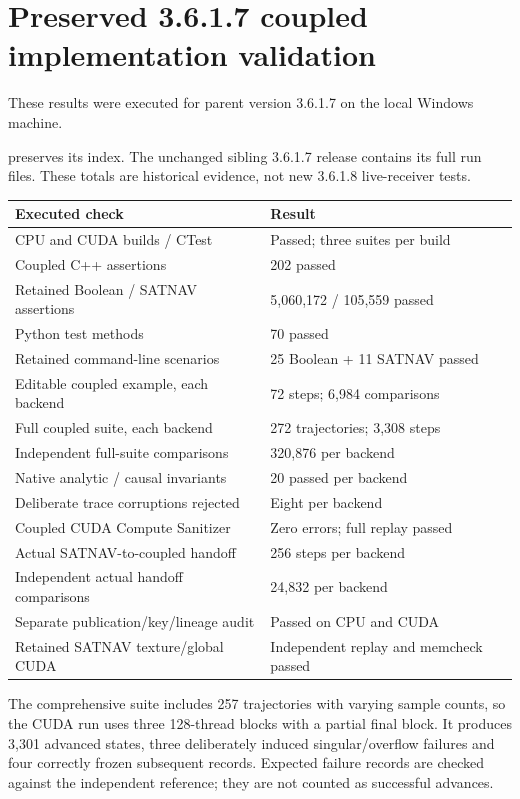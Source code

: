 \section{Preserved 3.6.1.7 coupled implementation validation}
These results were executed for parent version 3.6.1.7 on the local Windows machine.

 preserves its index.
The unchanged sibling 3.6.1.7 release contains its full run files. These totals
are historical evidence, not new 3.6.1.8 live-receiver tests.

\begin{center}
\begin{tabularx}{\textwidth}{@{}P{.54\textwidth}Y@{}}\toprule
\textbf{Executed check} & \textbf{Result}\\\midrule
CPU and CUDA builds / CTest & Passed; three suites per build\\
Coupled C++ assertions & 202 passed\\
Retained Boolean / SATNAV assertions & 5,060,172 / 105,559 passed\\
Python test methods & 70 passed\\
Retained command-line scenarios & 25 Boolean + 11 SATNAV passed\\
Editable coupled example, each backend & 72 steps; 6,984 comparisons\\
Full coupled suite, each backend & 272 trajectories; 3,308 steps\\
Independent full-suite comparisons & 320,876 per backend\\
Native analytic / causal invariants & 20 passed per backend\\
Deliberate trace corruptions rejected & Eight per backend\\
Coupled CUDA Compute Sanitizer & Zero errors; full replay passed\\
Actual SATNAV-to-coupled handoff & 256 steps per backend\\
Independent actual handoff comparisons & 24,832 per backend\\
Separate publication/key/lineage audit & Passed on CPU and CUDA\\
Retained SATNAV texture/global CUDA & Independent replay and memcheck passed\\\bottomrule
\end{tabularx}
\end{center}

The comprehensive suite includes 257 trajectories with varying sample counts, so
the CUDA run uses three 128-thread blocks with a partial final block. It produces
3,301 advanced states, three deliberately induced singular/overflow failures and
four correctly frozen subsequent records. Expected failure records are checked
against the independent reference; they are not counted as successful advances.


